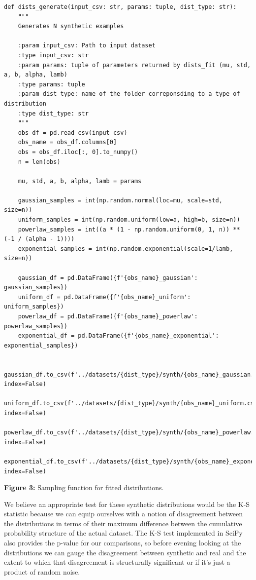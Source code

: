 \begin{verbatim}
def dists_generate(input_csv: str, params: tuple, dist_type: str):
    """
    Generates N synthetic examples

    :param input_csv: Path to input dataset
    :type input_csv: str
    :param params: tuple of parameters returned by dists_fit (mu, std, a, b, alpha, lamb)
    :type params: tuple
    :param dist_type: name of the folder correponsding to a type of distribution
    :type dist_type: str
    """
    obs_df = pd.read_csv(input_csv)
    obs_name = obs_df.columns[0]
    obs = obs_df.iloc[:, 0].to_numpy()
    n = len(obs)

    mu, std, a, b, alpha, lamb = params

    gaussian_samples = int(np.random.normal(loc=mu, scale=std, size=n))
    uniform_samples = int(np.random.uniform(low=a, high=b, size=n))
    powerlaw_samples = int((a * (1 - np.random.uniform(0, 1, n)) ** (-1 / (alpha - 1))))
    exponential_samples = int(np.random.exponential(scale=1/lamb, size=n))

    gaussian_df = pd.DataFrame({f'{obs_name}_gaussian': gaussian_samples})
    uniform_df = pd.DataFrame({f'{obs_name}_uniform': uniform_samples})
    powerlaw_df = pd.DataFrame({f'{obs_name}_powerlaw': powerlaw_samples})
    exponential_df = pd.DataFrame({f'{obs_name}_exponential': exponential_samples})
    
    gaussian_df.to_csv(f'../datasets/{dist_type}/synth/{obs_name}_gaussian.csv', index=False)
    uniform_df.to_csv(f'../datasets/{dist_type}/synth/{obs_name}_uniform.csv', index=False) 
    powerlaw_df.to_csv(f'../datasets/{dist_type}/synth/{obs_name}_powerlaw.csv', index=False)
    exponential_df.to_csv(f'../datasets/{dist_type}/synth/{obs_name}_exponential.csv', index=False)
\end{verbatim}

\begin{center}
\textbf{Figure 3:} Sampling function for fitted distributions.
\end{center}

We believe an appropriate test for these synthetic distributions would be the K-S statistic because we can equip ourselves with a notion of disagreement between the distributions in terms of their maximum difference between the cumulative probability structure of the actual dataset. The K-S test implemented in SciPy also provides the p-value for our comparisons, so before evening looking at the distributions we can gauge the disagreement between synthetic and real and the extent to which that disagreement is structurally significant or if it's just a product of random noise.\\

